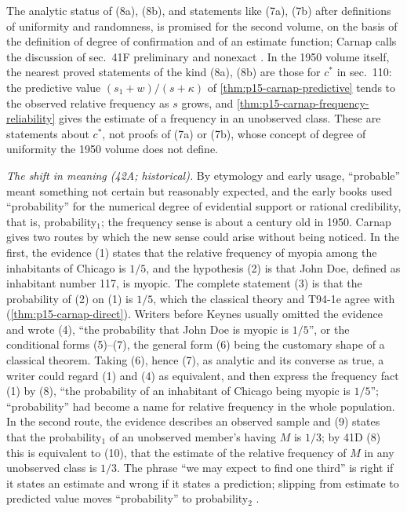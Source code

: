 The analytic status of (8a), (8b), and statements like (7a), (7b)
after definitions of uniformity and randomness, is promised for the
second volume, on the basis of the definition of degree of
confirmation and of an estimate function; Carnap calls the discussion
of sec.~41F preliminary and nonexact \cite[sec.~41F, pp.~181--182]{Carnap1950Probability}.
In the 1950 volume itself, the nearest proved statements of the kind
(8a), (8b) are those for \(c^*\) in sec.~110: the predictive value
\((s_1+w)/(s+\kappa)\) of \cref{thm:p15-carnap-predictive} tends to the
observed relative frequency as \(s\) grows, and
\cref{thm:p15-carnap-frequency-reliability} gives the estimate of a
frequency in an unobserved class. These are statements about \(c^*\),
not proofs of (7a) or (7b), whose concept of degree of uniformity the
1950 volume does not define.

\emph{The shift in meaning (42A; historical).} By etymology and early
usage, ``probable'' meant something not certain but reasonably
expected, and the early books used ``probability'' for the numerical
degree of evidential support or rational credibility, that is,
probability\(_1\); the frequency sense is about a century old in 1950.
Carnap gives two routes by which the new sense could arise without
being noticed. In the first, the evidence (1) states that the relative
frequency of myopia among the inhabitants of Chicago is \(1/5\), and
the hypothesis (2) is that John Doe, defined as inhabitant number 117,
is myopic. The complete statement (3) is that the probability of (2)
on (1) is \(1/5\), which the classical theory and T94-1e agree with
(\cref{thm:p15-carnap-direct}). Writers before Keynes usually omitted
the evidence and wrote (4), ``the probability that John Doe is myopic
is \(1/5\)'', or the conditional forms (5)--(7), the general form (6)
being the customary shape of a classical theorem. Taking (6), hence
(7), as analytic and its converse as true, a writer could regard (1)
and (4) as equivalent, and then express the frequency fact (1) by
(8), ``the probability of an inhabitant of Chicago being myopic is
\(1/5\)''; ``probability'' had become a name for relative frequency in
the whole population. In the second route, the evidence describes an
observed sample and (9) states that the probability\(_1\) of an
unobserved member's having \(M\) is \(1/3\); by 41D (8) this is
equivalent to (10), that the estimate of the relative frequency of
\(M\) in any unobserved class is \(1/3\). The phrase ``we may expect
to find one third'' is right if it states an estimate and wrong if it
states a prediction; slipping from estimate to predicted value moves
``probability'' to probability\(_2\)
\cite[sec.~42A, pp.~182--185]{Carnap1950Probability}.

